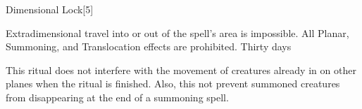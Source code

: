 \begin{spellsection}{Dimensional Lock}[5]
    \begin{spellheader}
    \end{spellheader}
    \begin{spellcontent}
        \begin{spelltargetinginfo}
        \end{spelltargetinginfo}
        \begin{spelleffects}
            \spelleffect Extradimensional travel into or out of the spell's area is impossible.
            All Planar, Summoning, and Translocation effects are prohibited.
            \spelldur Thirty days
        \end{spelleffects}
    \end{spellcontent}
    \begin{spellfooter}
        \spellnotes This ritual does not interfere with the movement of creatures already in on other planes when the ritual is finished. Also, this not prevent summoned creatures from disappearing at the end of a summoning spell.
    \end{spellfooter}
\end{spellsection}

